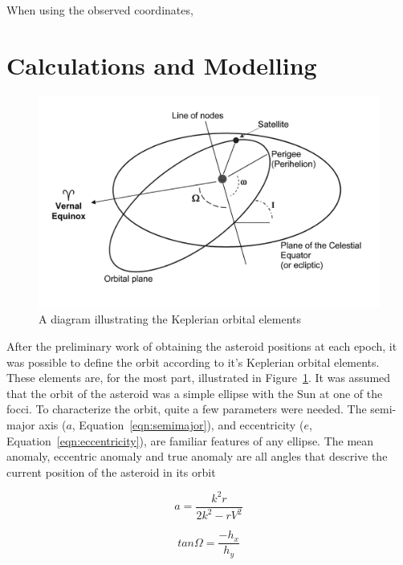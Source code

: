 \documentclass[a4paper,12pt]{article}
\begin{document}
When using the observed coordinates,




\section{Calculations and Modelling}
\label{sec:calc}

\begin{figure}
\includegraphics[scale = 0.15]{orbitalelements2.png}
\caption{A diagram illustrating the Keplerian orbital elements \citep{elements}}
\label{fig:elements}
\end{figure}

After the preliminary work of obtaining the asteroid positions at each epoch, it was possible to define the orbit according to it's Keplerian orbital elements. These elements are, for the most part, illustrated in Figure~\ref{fig:elements}. It was assumed that the orbit of the asteroid was a simple ellipse with the Sun at one of the focci. To characterize the orbit, quite a few parameters were needed. The semi-major axis ($a$, Equation~\ref{eqn:semimajor}), and eccentricity ($e$, Equation~\ref{eqn:eccentricity}), are familiar features of any ellipse. The mean anomaly, eccentric anomaly and true anomaly are all angles that descrive the current position of the asteroid in its orbit



\begin{equation}
a = \frac{k^2r}{2k^2-rV^2}
\label{eqn:semimajor}
\end{equation}

\begin{equation}
tan\Omega = \frac{-h_x}{h_y}
\label{eqn:ascendingnode}
\end{equation}
\end{document}
